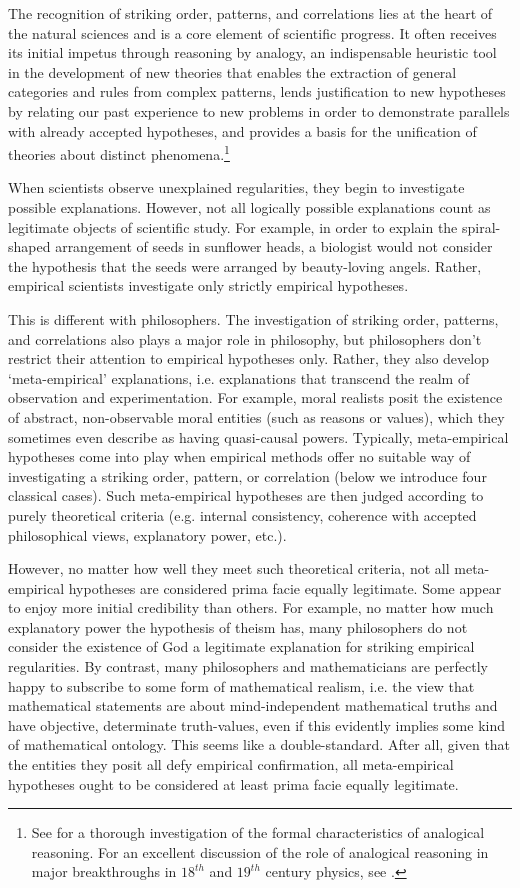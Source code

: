 \documentclass[a4paper,12pt]{article}
\begin{document}
The recognition of striking order, patterns, and correlations lies at the heart of the natural sciences and is a core element of scientific progress. It often receives its initial impetus through reasoning by analogy, an indispensable heuristic tool in the development of new theories that enables the extraction of general categories and rules from complex patterns, lends justification to new hypotheses by relating our past experience to new problems in order to demonstrate parallels with already accepted hypotheses, and provides a basis for the unification of theories about distinct phenomena.\footnote{See \cite{Bartha2010} for a thorough investigation of the formal characteristics of analogical reasoning. For an excellent discussion of the role of analogical reasoning in major breakthroughs in $18^{th}$ and $19^{th}$ century physics, see \cite{Steiner1989,Steiner1998}.}

When scientists observe unexplained regularities, they begin to investigate possible explanations. However, not all logically possible explanations count as legitimate objects of scientific study. For example, in order to explain the spiral-shaped arrangement of seeds in sunflower heads, a biologist would not consider the hypothesis that the seeds were arranged by beauty-loving angels. Rather, empirical scientists investigate only strictly empirical hypotheses.

This is different with philosophers. The investigation of striking order, patterns, and correlations also plays a major role in philosophy, but philosophers don't restrict their attention to empirical hypotheses only. Rather, they also develop `meta-empirical' explanations, i.e. explanations that transcend the realm of observation and experimentation. For example, moral realists posit the existence of abstract, non-observable moral entities (such as reasons or values), which they sometimes even describe as having quasi-causal powers. Typically, meta-empirical hypotheses come into play when empirical methods offer no suitable way of investigating a striking order, pattern, or correlation (below we introduce four classical cases). Such meta-empirical hypotheses are then judged according to purely theoretical criteria (e.g. internal consistency, coherence with accepted philosophical views, explanatory power, etc.).

However, no matter how well they meet such theoretical criteria, not all meta-empirical hypotheses are considered prima facie equally legitimate. Some appear to enjoy more initial credibility than others. For example, no matter how much explanatory power the hypothesis of theism has, many philosophers do not consider the existence of God a legitimate explanation for striking empirical regularities. By contrast, many philosophers and mathematicians are perfectly happy to subscribe to some form of mathematical realism, i.e. the view that mathematical statements are about mind-independent mathematical truths and have objective, determinate truth-values, even if this evidently implies some kind of mathematical ontology. This seems like a double-standard. After all, given that the entities they posit all defy empirical confirmation, all meta-empirical hypotheses ought to be considered at least prima facie equally legitimate.
\end{document}
